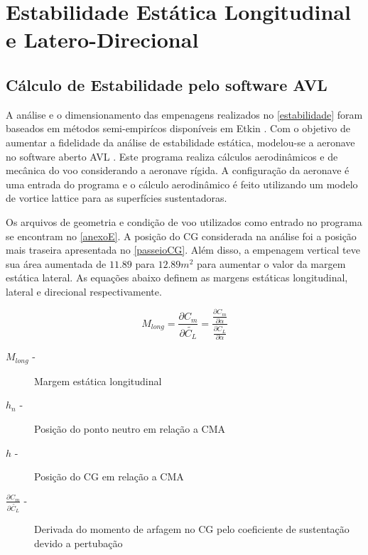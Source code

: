 \chapter{Estabilidade Estática Longitudinal e Latero-Direcional}

\section{Cálculo de Estabilidade pelo software AVL}

A análise e o dimensionamento das empenagens realizados no \autoref{estabilidade} foram baseados em métodos semi-empirícos disponíveis em Etkin \cite{etkin1996dynamics}. Com o objetivo de aumentar a fidelidade da análise de estabilidade estática, modelou-se a aeronave no software aberto AVL \cite{avl}. Este programa realiza cálculos aerodinâmicos e de mecânica do voo considerando a aeronave rígida. A configuração da aeronave é uma entrada do programa e o cálculo aerodinâmico é feito utilizando um modelo de vortice lattice para as superfícies sustentadoras.

Os arquivos de geometria e condição de voo utilizados como entrado no programa se encontram no \autoref{anexoE}. A posição do CG considerada na análise foi a posição mais traseira apresentada no \autoref{passeioCG}. Além disso, a empenagem vertical teve sua área aumentada de $11.89$ para $12.89 m^2$ para aumentar o valor da margem estática lateral. As equações abaixo definem as margens estáticas longitudinal, lateral e direcional respectivamente.

\begin{equation}
  M_{long} = \frac{\partial C_m}{ \partial \widetilde{C_L}} = \frac{\frac{\partial C_m}{ \partial \alpha} }{\frac{\partial C_L}{ \partial \alpha} }
\end{equation}

\begin{description}
\item[$M_{long}$  -] Margem estática longitudinal
\item[$h_n$ -] Posição do ponto neutro em relação a CMA
\item[$h$ -] Posição do CG em relação a CMA
\item[$\frac{\partial C_m}{\partial \widetilde{C_L}}$ -] Derivada do momento de arfagem no CG pelo coeficiente de sustentação devido a pertubação
\end{description}

\vspace{1cm}


